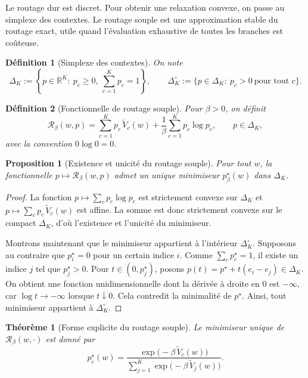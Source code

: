 \documentclass[11pt,a4paper]{article}
\newtheorem{definition}{Définition}[section]
\newtheorem{proposition}{Proposition}[section]
\newtheorem{theorem}{Théorème}[section]
\newcommand{\R}{\mathbb R}
\newcommand{\Rcal}{\mathcal R}
\begin{document}
Le routage dur est discret. Pour obtenir une relaxation convexe, on passe au simplexe des contextes. Le routage souple est une approximation stable du routage exact, utile quand l'évaluation exhaustive de toutes les branches est coûteuse.

\begin{definition}[Simplexe des contextes]
On note
\[
\Delta_K:=\left\{p\in\R^K:\ p_c\ge 0,\ \sum_{c=1}^K p_c=1\right\},
\qquad
\Delta_K^\circ:=\{p\in\Delta_K:\ p_c>0\ \text{pour tout }c\}.
\]
\end{definition}

\begin{definition}[Fonctionnelle de routage souple]
Pour \(\beta>0\), on définit
\[
\Rcal_\beta(w,p)
=
\sum_{c=1}^K p_c\,\widetilde V_c(w)
+\frac{1}{\beta}\sum_{c=1}^K p_c\log p_c,
\qquad p\in\Delta_K,
\]
avec la convention \(0\log 0=0\).
\end{definition}

\begin{proposition}[Existence et unicité du routage souple]
Pour tout \(w\), la fonctionnelle \(p\mapsto \Rcal_\beta(w,p)\) admet un unique minimiseur \(p^\star_\beta(w)\) dans \(\Delta_K\).
\end{proposition}

\begin{proof}
La fonction \(p\mapsto \sum_c p_c\log p_c\) est strictement convexe sur \(\Delta_K\) et \(p\mapsto \sum_c p_c\,\widetilde V_c(w)\) est affine. La somme est donc strictement convexe sur le compact \(\Delta_K\), d'où l'existence et l'unicité du minimiseur.

Montrons maintenant que le minimiseur appartient à l'intérieur \(\Delta_K^\circ\). Supposons au contraire que \(p^\star_i=0\) pour un certain indice \(i\). Comme \(\sum_c p^\star_c=1\), il existe un indice \(j\) tel que \(p^\star_j>0\). Pour \(t\in(0,p^\star_j)\), posons \(p(t)=p^\star+t(e_i-e_j)\in\Delta_K\). On obtient une fonction unidimensionnelle dont la dérivée à droite en \(0\) est \(-\infty\), car \(\log t\to-\infty\) lorsque \(t\downarrow 0\). Cela contredit la minimalité de \(p^\star\). Ainsi, tout minimiseur appartient à \(\Delta_K^\circ\).
\end{proof}

\begin{theorem}[Forme explicite du routage souple]
Le minimiseur unique de \(\Rcal_\beta(w,\cdot)\) est donné par
\[
 p_c^\star(w)=\frac{\exp\!\bigl(-\beta\,\widetilde V_c(w)\bigr)}
 {\sum_{j=1}^K \exp\!\bigl(-\beta\,\widetilde V_j(w)\bigr)}.
\]
\end{theorem}
\end{document}
